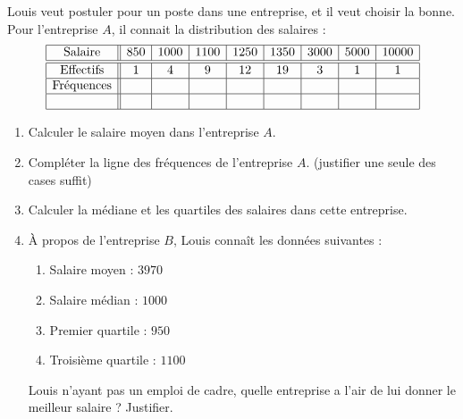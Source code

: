 
\begin{exercice}\label{exosmath-0532}

    Louis veut postuler pour un poste dans une entreprise, et il veut choisir la bonne. Pour l'entreprise \( A\), il connait la distribution des salaires :
    \begin{equation*}
        \begin{array}[]{|c||c|c|c|c|c|c|c|c|}
            \hline
            \text{Salaire}&850&1000&1100&1250&1350&3000&5000&10000\\
            \hline\hline
            \text{Effectifs}&1&4&9&12&19&3&1&1\\
            \hline
            \text{Fréquences}&&&&&&&&\\
            \hline
            &&&&&&&&\\
            \hline
        \end{array}
    \end{equation*}
    \begin{multicols}{2}
        \begin{enumerate}
            \item
                Calculer le salaire moyen dans l'entreprise \( A\).
            \item
                Compléter la ligne des fréquences de l'entreprise \( A\). (justifier une seule des cases suffit)
            \item
                Calculer la médiane et les quartiles des salaires dans cette entreprise.
            \item
                À propos de l'entreprise \( B\), Louis connaît les données suivantes :
                \begin{enumerate}
                    \item
                        Salaire moyen : \( 3970\)
                    \item
                        Salaire médian : \( 1000\)
                    \item
                        Premier quartile : \( 950\)
                    \item
                        Troisième quartile : \( 1100\)
                \end{enumerate}
                Louis n'ayant pas un emploi de cadre, quelle entreprise a l'air de lui donner le meilleur salaire ? Justifier.
        \end{enumerate}
    \end{multicols}

\end{exercice}
